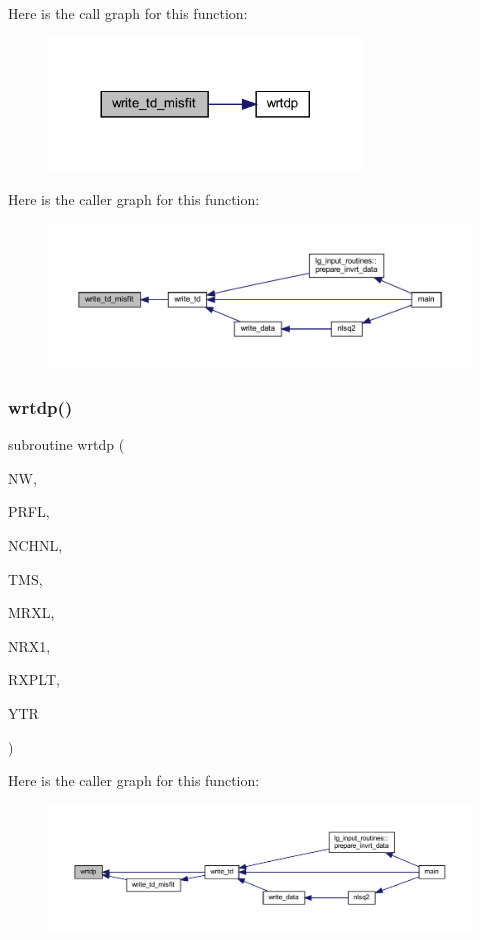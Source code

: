 Here is the call graph for this function\+:\nopagebreak
\begin{figure}[H]
\begin{center}
\leavevmode
\includegraphics[width=236pt]{Leroi_8f90_ae92c690eb0a03d9faf58627a9777375f_cgraph}
\end{center}
\end{figure}
Here is the caller graph for this function\+:\nopagebreak
\begin{figure}[H]
\begin{center}
\leavevmode
\includegraphics[width=350pt]{Leroi_8f90_ae92c690eb0a03d9faf58627a9777375f_icgraph}
\end{center}
\end{figure}
\mbox{\label{Leroi_8f90_a6dd9c54049a223ff90b461f73c11015a}} 
\subsubsection{\texorpdfstring{wrtdp()}{wrtdp()}}
{\footnotesize\ttfamily subroutine wrtdp (\begin{DoxyParamCaption}\item[{integer}]{NW,  }\item[{integer}]{P\+R\+FL,  }\item[{integer}]{N\+C\+H\+NL,  }\item[{real, dimension(nchnl)}]{T\+MS,  }\item[{integer}]{M\+R\+XL,  }\item[{integer}]{N\+R\+X1,  }\item[{real(kind=ql), dimension(3,mrxl)}]{R\+X\+P\+LT,  }\item[{real, dimension(nchnl,mrxl)}]{Y\+TR }\end{DoxyParamCaption})}

Here is the caller graph for this function\+:\nopagebreak
\begin{figure}[H]
\begin{center}
\leavevmode
\includegraphics[width=350pt]{Leroi_8f90_a6dd9c54049a223ff90b461f73c11015a_icgraph}
\end{center}
\end{figure}
